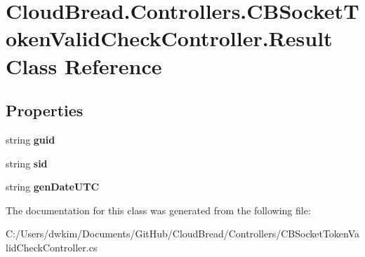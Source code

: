 \hypertarget{a00084}{}\section{Cloud\+Bread.\+Controllers.\+C\+B\+Socket\+Token\+Valid\+Check\+Controller.\+Result Class Reference}
\label{a00084}
\subsection*{Properties}
\begin{DoxyCompactItemize}
\item 
string {\bfseries guid}\hypertarget{a00084_a71d2ad22a430c89433720293ca4b5cde}{}\label{a00084_a71d2ad22a430c89433720293ca4b5cde}

\item 
string {\bfseries sid}\hypertarget{a00084_a27b174d6d8a5645c40927e29e65f0900}{}\label{a00084_a27b174d6d8a5645c40927e29e65f0900}

\item 
string {\bfseries gen\+Date\+U\+TC}\hypertarget{a00084_a87b42e051f1bdd2966a92aa14f29ce76}{}\label{a00084_a87b42e051f1bdd2966a92aa14f29ce76}

\end{DoxyCompactItemize}


The documentation for this class was generated from the following file\+:\begin{DoxyCompactItemize}
\item 
C\+:/\+Users/dwkim/\+Documents/\+Git\+Hub/\+Cloud\+Bread/\+Controllers/C\+B\+Socket\+Token\+Valid\+Check\+Controller.\+cs\end{DoxyCompactItemize}
